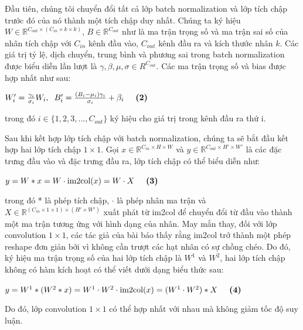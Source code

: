 \documentclass[a4paper,12pt]{article}
\begin{document}
Đầu tiên, chúng tôi chuyển đổi tất cả lớp batch normalization và lớp tích chập trước đó của nó thành một tích chập duy nhất. Chúng ta ký hiệu $W \in \mathbb{R}^{C_{out}\times(C_{in}\times k \times k)}$, $B \in \mathbb{R}^{C_{out}}$ như là ma trận trọng số và ma trận sai số của nhân tích chập với $C_{in}$ kênh đầu vào, $C_{out}$ kênh đầu ra và kích thước nhân $k$. Các giá trị tỷ lệ, dịch chuyển, trung bình và phương sai trong batch normalization được biểu diễn lần lượt là $\gamma, \beta, \mu, \sigma \in R^{C_{out}}$. Các ma trận trọng số và bias được hợp nhất như sau:
\begin{center}
    $W'_i = \frac{\gamma_i}{\sigma_i}W_i, \hspace*{2mm} B'_i = \frac{(B_i - \mu_i)\gamma_i}{\sigma_i} + \beta_i  \hspace*{5mm} \textbf{(2)}$
\end{center}
trong đó $i \in \{ 1, 2, 3, ..., C_{out} \} $ ký hiệu cho giá trị trong kênh đầu ra thứ i.

Sau khi kết hợp lớp tích chập với batch normalization, chúng ta sẽ bắt đầu kết hợp hai lớp tích chập $1\times 1$. Gọi $x \in \mathbb{R}^{C_{in}\times H \times W}$ và $y \in \mathbb{R}^{C_{out}\times H' \times W'}$ là các đặc trưng đầu vào và đặc trưng đầu ra, lớp tích chập có thể biểu diễn như:
\begin{center}
    $y = W * x = W \cdot \text{im2col}(x) = W \cdot X \hspace*{5mm} \textbf{(3)}$
\end{center}
trong đó * là phép tích chập, $\cdot$ là phép nhân ma trận và $X \in \mathbb{R}^{(C_{in}\times 1 \times 1) \times (H' \times W')}$ xuất phát từ im2col \cite{qochuk_im2col} để chuyển đổi từ đầu vào thành một ma trận tương ứng với hình dạng của nhân. May mắn thay, đối với lớp convolution $1\times 1$, các tác giả của bài báo thấy rằng im2col trở thành một phép reshape đơn giản bởi vì không cần trượt các hạt nhân có sự chồng chéo. Do đó, ký hiệu ma trận trọng số của hai lớp tích chập là $W^1$ và $W^2$, hai lớp tích chập không có hàm kích hoạt có thể viết dưới dạng biểu thức sau:
\begin{center}
    $y = W^1 * (W^2*x) = W^1\cdot W^2 \cdot \text{im2col}(x) = (W^1 \cdot W^2) * X \hspace*{5mm} \textbf{(4)}$
\end{center}
Do đó, lớp convolution $1\times 1$ có thể hợp nhất với nhau mà không giảm tốc độ suy luận.
\end{document}
